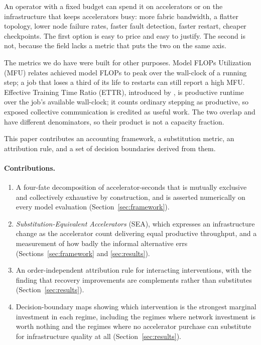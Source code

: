 \documentclass[11pt]{article}
\begin{document}
An operator with a fixed budget can spend it on accelerators or on the
infrastructure that keeps accelerators busy: more fabric bandwidth, a flatter
topology, lower node failure rates, faster fault detection, faster restart,
cheaper checkpoints. The first option is easy to price and easy to justify. The
second is not, because the field lacks a metric that puts the two on the same
axis.

The metrics we do have were built for other purposes. Model FLOPs Utilization
(MFU) relates achieved model FLOPs to peak over the wall-clock of a running
step; a job that loses a third of its life to restarts can still report a high
MFU. Effective Training Time Ratio (ETTR), introduced by
\citet{kokolis2025reliability}, is productive runtime over the job's available
wall-clock; it counts ordinary stepping as productive, so exposed collective
communication is credited as useful work. The two overlap and have different
denominators, so their product is not a capacity fraction.

This paper contributes an accounting framework, a substitution metric, an
attribution rule, and a set of decision boundaries derived from them.

\paragraph{Contributions.}
\begin{enumerate}
\item A four-fate decomposition of accelerator-seconds that is mutually
exclusive and collectively exhaustive by construction, and is asserted
numerically on every model evaluation (Section~\ref{sec:framework}).
\item \emph{Substitution-Equivalent Accelerators} (SEA), which expresses an
infrastructure change as the accelerator count delivering equal productive
throughput, and a measurement of how badly the informal alternative errs
(Sections~\ref{sec:framework} and \ref{sec:results}).
\item An order-independent attribution rule for interacting interventions, with
the finding that recovery improvements are complements rather than substitutes
(Section~\ref{sec:results}).
\item Decision-boundary maps showing which intervention is the strongest
marginal investment in each regime, including the regimes where network
investment is worth nothing and the regimes where no accelerator purchase can
substitute for infrastructure quality at all (Section~\ref{sec:results}).
\end{enumerate}
\end{document}
